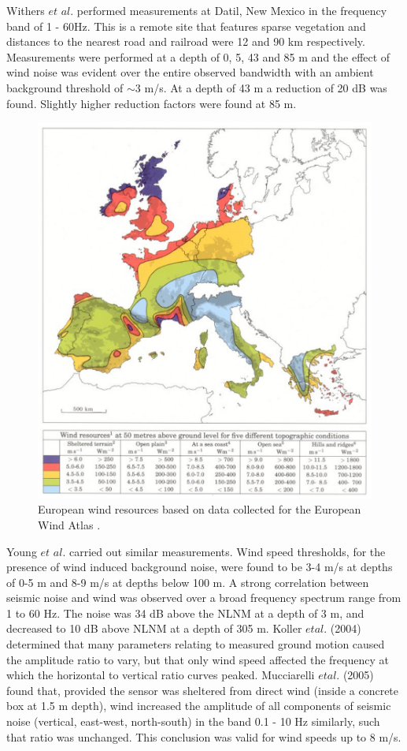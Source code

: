 Withers $et$ $al.$ \cite{Withers1996} performed measurements at Datil, New Mexico in the frequency band of 1 - 60Hz. This is a remote site that features sparse vegetation and distances to the nearest road and railroad were 12 and 90 km respectively. Measurements were performed at a depth of 0, 5, 43 and 85 m and the effect of wind noise was evident over the entire observed bandwidth with an ambient background threshold of $\sim$3 m/s. At a depth of 43 m a reduction of 20 dB was found. Slightly higher reduction factors were found at 85 m.
\begin{figure}[h!]
	\begin{center}
		\includegraphics[width=12cm]{./Sec_SiteInfra/Figures/wind.pdf}
		\caption{European wind resources based on data collected for the European Wind Atlas \cite{WindatlasWWW}.}
		\label{fig3.5}
	\end{center}
\end{figure}

Young $et$ $al.$ \cite{Young1996} carried out similar measurements. Wind speed thresholds, for the presence of wind induced background noise, were found to be 3-4 m/s at depths of 0-5 m and 8-9 m/s at depths below 100 m. A strong correlation between seismic noise and wind was observed over a broad frequency spectrum range from 1 to 60 Hz. The noise was 34 dB above the NLNM at a depth of 3 m, and decreased to 10 dB above NLNM at a depth of 305 m. Koller $et al$. (2004) determined that many parameters relating to measured ground motion caused the amplitude ratio to vary, but that only wind speed affected the frequency at which the horizontal to vertical ratio curves peaked. Mucciarelli $et al$. (2005) found that, provided the sensor was sheltered from direct wind (inside a concrete box at 1.5 m depth), wind increased the amplitude of all components of seismic noise (vertical, east-west, north-south) in the band 0.1 - 10 Hz similarly, such that ratio was unchanged. This conclusion was valid for wind speeds up to 8 m/s. 

